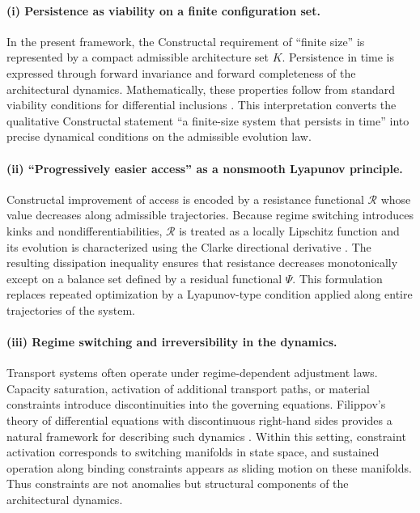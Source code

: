 \documentclass[12pt]{article}
\theoremstyle{plain}
\theoremstyle{definition}
\theoremstyle{remark}
\begin{document}
\paragraph{(i) Persistence as viability on a finite configuration set.}

In the present framework, the Constructal requirement of ``finite size''
is represented by a compact admissible architecture set $K$.
Persistence in time is expressed through forward invariance and forward
completeness of the architectural dynamics.
Mathematically, these properties follow from standard viability
conditions for differential inclusions
\cite{Aubin1983DifferentialInclusions}.
This interpretation converts the qualitative Constructal statement
``a finite-size system that persists in time'' into precise dynamical
conditions on the admissible evolution law.

\paragraph{(ii) ``Progressively easier access'' as a nonsmooth Lyapunov principle.}

Constructal improvement of access is encoded by a resistance functional
$\mathcal R$ whose value decreases along admissible trajectories.
Because regime switching introduces kinks and nondifferentiabilities,
$\mathcal R$ is treated as a locally Lipschitz function and its evolution
is characterized using the Clarke directional derivative
\cite{Clarke1983}.
The resulting dissipation inequality ensures that resistance decreases
monotonically except on a balance set defined by a residual functional
$\Psi$.
This formulation replaces repeated optimization by a Lyapunov-type
condition applied along entire trajectories of the system.

\paragraph{(iii) Regime switching and irreversibility in the dynamics.}

Transport systems often operate under regime-dependent adjustment laws.
Capacity saturation, activation of additional transport paths,
or material constraints introduce discontinuities into the governing
equations.
Filippov’s theory of differential equations with discontinuous
right-hand sides provides a natural framework for describing such
dynamics
\cite{Filippov1988,diBernardo2008,Cortes2009}.
Within this setting, constraint activation corresponds to switching
manifolds in state space, and sustained operation along binding
constraints appears as sliding motion on these manifolds.
Thus constraints are not anomalies but structural components of the
architectural dynamics.
\end{document}
